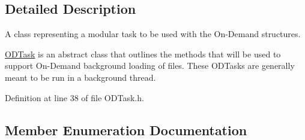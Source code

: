 \subsection{Detailed Description}
A class representing a modular task to be used with the On-\/\+Demand structures. 

\hyperlink{class_o_d_task}{O\+D\+Task} is an abstract class that outlines the methods that will be used to support On-\/\+Demand background loading of files. These O\+D\+Tasks are generally meant to be run in a background thread. 

Definition at line 38 of file O\+D\+Task.\+h.



\subsection{Member Enumeration Documentation}
